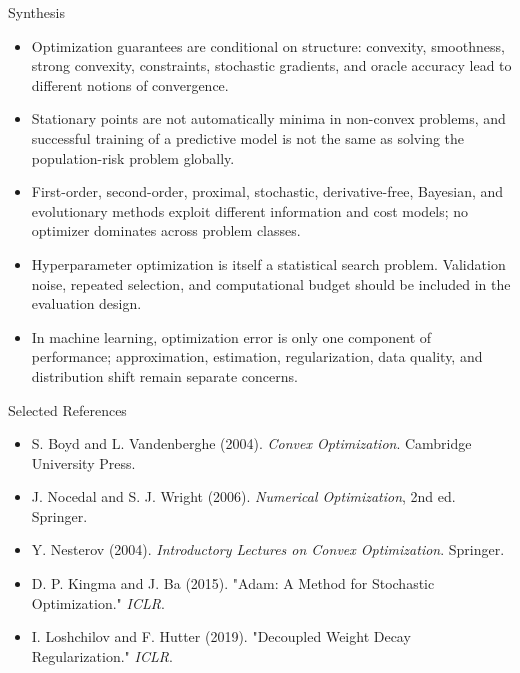 \documentclass[aspectratio=169]{beamer}
\begin{document}
\begin{frame}{Synthesis}
  \begin{itemize}
    \item Optimization guarantees are conditional on structure: convexity, smoothness, strong convexity, constraints, stochastic gradients, and oracle accuracy lead to different notions of convergence.
    \item Stationary points are not automatically minima in non-convex problems, and successful training of a predictive model is not the same as solving the population-risk problem globally.
    \item First-order, second-order, proximal, stochastic, derivative-free, Bayesian, and evolutionary methods exploit different information and cost models; no optimizer dominates across problem classes.
    \item Hyperparameter optimization is itself a statistical search problem. Validation noise, repeated selection, and computational budget should be included in the evaluation design.
    \item In machine learning, optimization error is only one component of performance; approximation, estimation, regularization, data quality, and distribution shift remain separate concerns.
  \end{itemize}
\end{frame}

\begin{frame}{Selected References}
  \small
  \begin{itemize}
    \item S. Boyd and L. Vandenberghe (2004). \textit{Convex Optimization}. Cambridge University Press.
    \item J. Nocedal and S. J. Wright (2006). \textit{Numerical Optimization}, 2nd ed. Springer.
    \item Y. Nesterov (2004). \textit{Introductory Lectures on Convex Optimization}. Springer.
    \item D. P. Kingma and J. Ba (2015). "Adam: A Method for Stochastic Optimization." \textit{ICLR}.
    \item I. Loshchilov and F. Hutter (2019). "Decoupled Weight Decay Regularization." \textit{ICLR}.
  \end{itemize}
\end{frame}

\contactslide
\end{document}
